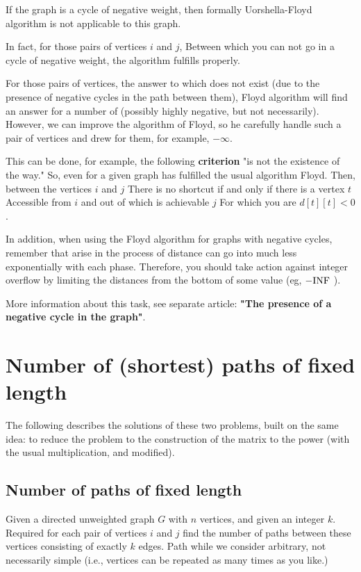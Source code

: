 If the graph is a cycle of negative weight, then formally Uorshella-Floyd algorithm is not applicable to this graph.

In fact, for those pairs of vertices $i$ and $j$, Between which you can not go in a cycle of negative weight, the algorithm fulfills properly.

For those pairs of vertices, the answer to which does not exist (due to the presence of negative cycles in the path between them), Floyd algorithm will find an answer for a number of (possibly highly negative, but not necessarily). However, we can improve the algorithm of Floyd, so he carefully handle such a pair of vertices and drew for them, for example, $- \infty$.

This can be done, for example, the following \textbf{criterion} "is not the existence of the way." So, even for a given graph has fulfilled the usual algorithm Floyd. Then, between the vertices $i$ and $j$ There is no shortcut if and only if there is a vertex $t$ Accessible from $i$ and out of which is achievable $j$ For which you are $d [t][t] <0$.

In addition, when using the Floyd algorithm for graphs with negative cycles, remember that arise in the process of distance can go into much less exponentially with each phase. Therefore, you should take action against integer overflow by limiting the distances from the bottom of some value (eg, $- {\rm INF}$ ).

More information about this task, see separate article: \textbf{"The presence of a negative cycle in the graph"}.

\section{ Number of (shortest) paths of fixed length }
The following describes the solutions of these two problems, built on the same idea: to reduce the problem to the construction of the matrix to the power (with the usual multiplication, and modified).

\subsection{ Number of paths of fixed length }

Given a directed unweighted graph $G$ with $n$ vertices, and given an integer $k$. Required for each pair of vertices $i$ and $j$ find the number of paths between these vertices consisting of exactly $k$ edges. Path while we consider arbitrary, not necessarily simple (i.e., vertices can be repeated as many times as you like.)

